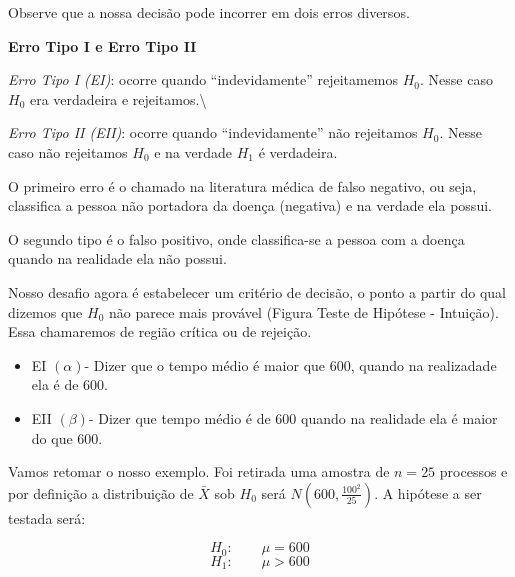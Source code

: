\documentclass[
  letterpaper,
  DIV=11,
  numbers=noendperiod]{scrreprt}
\providecommand{\tightlist}{%
  \setlength{\itemsep}{0pt}\setlength{\parskip}{0pt}}
\begin{document}
Observe que a nossa decisão pode incorrer em dois erros diversos.

\begin{tcolorbox}[enhanced jigsaw, titlerule=0mm, colback=white, coltitle=black, opacityback=0, breakable, colbacktitle=quarto-callout-note-color!10!white, toprule=.15mm, colframe=quarto-callout-note-color-frame, toptitle=1mm, bottomtitle=1mm, opacitybacktitle=0.6, left=2mm, arc=.35mm, rightrule=.15mm, bottomrule=.15mm, leftrule=.75mm, title=\textcolor{quarto-callout-note-color}{\faInfo}\hspace{0.5em}{Erro Tipo I e Erro Tipo II}]

\textbf{Erro Tipo I e Erro Tipo II}

\emph{Erro Tipo I (EI)}: ocorre quando ``indevidamente'' rejeitamemos
\(H_0\). Nesse caso \(H_0\) era verdadeira e rejeitamos.\textbackslash{}

\emph{Erro Tipo II (EII)}: ocorre quando ``indevidamente'' não
rejeitamos \(H_0\). Nesse caso não rejeitamos \(H_0\) e na verdade
\(H_1\) é verdadeira.

\end{tcolorbox}

O primeiro erro é o chamado na literatura médica de falso negativo, ou
seja, classifica a pessoa não portadora da doença (negativa) e na
verdade ela possui.

O segundo tipo é o falso positivo, onde classifica-se a pessoa com a
doença quando na realidade ela não possui.

Nosso desafio agora é estabelecer um critério de decisão, o ponto a
partir do qual dizemos que \(H_0\) não parece mais provável (Figura
Teste de Hipótese - Intuição). Essa chamaremos de região crítica ou de
rejeição.

\begin{itemize}
\tightlist
\item
  EI \((\alpha)\)- Dizer que o tempo médio é maior que 600, quando na
  realizadade ela é de 600.
\item
  EII \((\beta)\)- Dizer que tempo médio é de 600 quando na realidade
  ela é maior do que 600.
\end{itemize}

Vamos retomar o nosso exemplo. Foi retirada uma amostra de \(n=25\)
processos e por definição a distribuição de \(\bar{X}\) sob \(H_0\) será
\(N(600,\frac{100^2}{25})\). A hipótese a ser testada será:

\[H_0: \qquad \mu=600\] \[H_1: \qquad \mu>600\]
\end{document}

